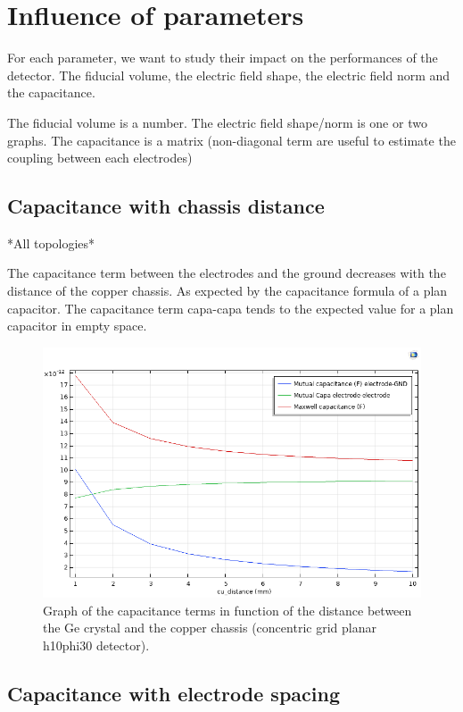 \section{Influence of parameters}

For each parameter, we want to study their impact on the performances of the detector.
The fiducial volume, the electric field shape, the electric field norm and the capacitance.

The fiducial volume is a number.
The electric field shape/norm is one or two graphs.
The capacitance is a matrix (non-diagonal term are useful to estimate the coupling between each electrodes)

\subsection{Capacitance with chassis distance}

*All topologies*

The capacitance term between the electrodes and the ground decreases with the distance of the copper chassis. As expected by the capacitance formula of a plan capacitor.
The capacitance term capa-capa tends to the expected value for a plan capacitor in empty space.

\begin{figure}
\centering
\includegraphics[width=\linewidth]{Figures/Electrodes/capacitance_chassis_distance.png}
\caption{Graph of the capacitance terms in function of the distance between the Ge crystal and the copper chassis (concentric grid planar h10phi30 detector).}
\label{fig:capcaitance-chassis-distance}
\end{figure}

\subsection{Capacitance with electrode spacing}

